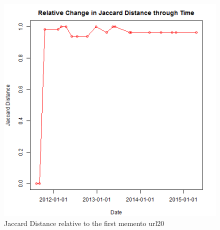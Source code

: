 \begin{figure}[ht]
	\begin{center}
		 \includegraphics[scale=0.60]{url20}
		  \caption{Jaccard Distance relative to the first memento url20}
	 \end{center}
\end{figure}